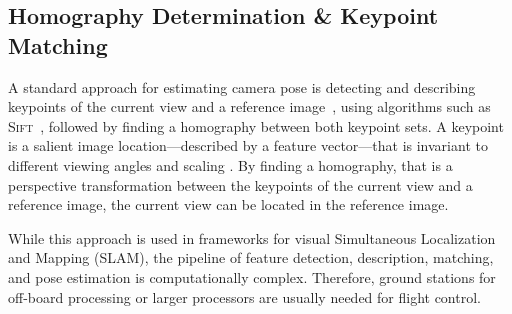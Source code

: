 \subsection{Homography Determination \& Keypoint Matching}
\label{sec:keypointmatching}

A standard approach for estimating camera pose is detecting and
describing keypoints of the current view and a reference image~\cite{se2002global}, using
algorithms such as \textsc{Sift}~\cite{lowe1999object}, followed by finding a homography between both keypoint sets. A
keypoint is a salient image location---described by a feature vector---that is invariant to different
viewing angles and scaling . By finding a homography, that is a perspective transformation between the keypoints of the current view and a reference image, the current view can be located in the reference image.


While this approach is used in frameworks for visual Simultaneous Localization and Mapping (SLAM), the pipeline of feature detection, description, matching, and pose estimation is computationally complex. Therefore, ground stations for off-board processing or larger processors are usually needed for flight control.  


